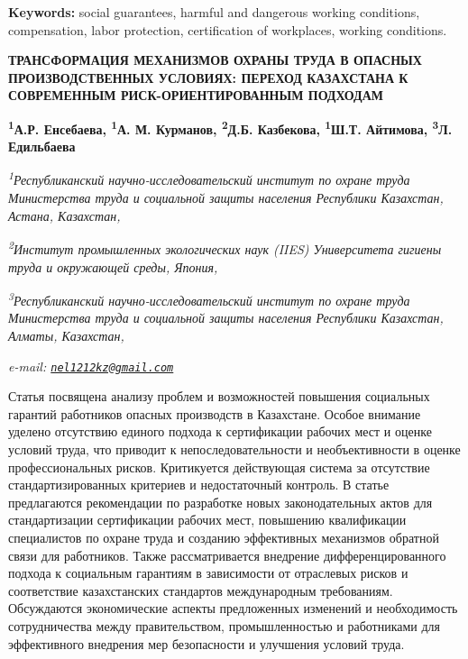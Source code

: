 {\bfseries Keywords:} social guarantees, harmful and dangerous working
conditions, compensation, labor protection, certification of workplaces,
working conditions.

\begin{articleheader}
{\bfseries ТРАНСФОРМАЦИЯ МЕХАНИЗМОВ ОХРАНЫ ТРУДА В ОПАСНЫХ ПРОИЗВОДСТВЕННЫХ УСЛОВИЯХ: ПЕРЕХОД КАЗАХСТАНА К СОВРЕМЕННЫМ РИСК-ОРИЕНТИРОВАННЫМ ПОДХОДАМ}

{\bfseries
\textsuperscript{1}А.Р. Енсебаева\textsuperscript{\envelope },
\textsuperscript{1}А. М. Курманов,
\textsuperscript{2}Д.Б. Казбекова,
\textsuperscript{1}Ш.Т. Айтимова,
\textsuperscript{3}Л. Едильбаева}
\end{articleheader}

\begin{affiliation}
\emph{\textsuperscript{1}Республиканский научно-исследовательский институт по охране труда Министерства труда и социальной защиты населения Республики Казахстан, Астана, Казахстан,}

\emph{\textsuperscript{2}Институт промышленных экологических наук (IIES) Университета гигиены труда и окружающей среды, Япония,}

\emph{\textsuperscript{3}Республиканский научно-исследовательский институт по охране труда Министерства труда и социальной защиты населения Республики Казахстан, Алматы, Казахстан,}

\emph{e-mail: \href{mailto:nel1212kz@gmail.com}{\nolinkurl{nel1212kz@gmail.com}}}
\end{affiliation}

Статья посвящена анализу проблем и возможностей повышения социальных
гарантий работников опасных производств в Казахстане. Особое внимание
уделено отсутствию единого подхода к сертификации рабочих мест и оценке
условий труда, что приводит к непоследовательности и необъективности в
оценке профессиональных рисков. Критикуется действующая система за
отсутствие стандартизированных критериев и недостаточный контроль. В
статье предлагаются рекомендации по разработке новых законодательных
актов для стандартизации сертификации рабочих мест, повышению
квалификации специалистов по охране труда и созданию эффективных
механизмов обратной связи для работников. Также рассматривается
внедрение дифференцированного подхода к социальным гарантиям в
зависимости от отраслевых рисков и соответствие казахстанских стандартов
международным требованиям. Обсуждаются экономические аспекты
предложенных изменений и необходимость сотрудничества между
правительством, промышленностью и работниками для эффективного внедрения
мер безопасности и улучшения условий труда.

